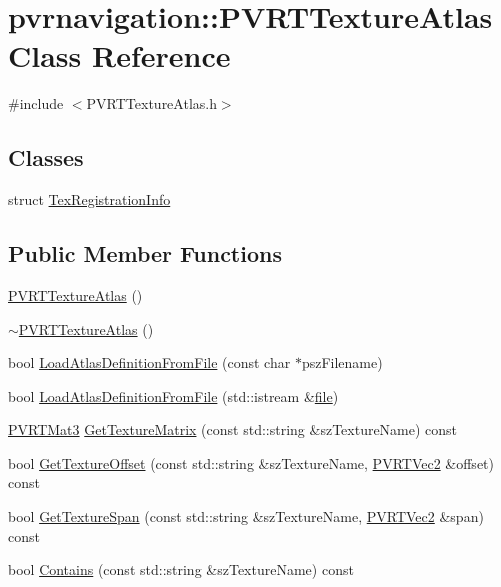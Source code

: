 \hypertarget{classpvrnavigation_1_1_p_v_r_t_texture_atlas}{\section{pvrnavigation\+:\+:P\+V\+R\+T\+Texture\+Atlas Class Reference}
\label{classpvrnavigation_1_1_p_v_r_t_texture_atlas}
}


{\ttfamily \#include $<$P\+V\+R\+T\+Texture\+Atlas.\+h$>$}

\subsection*{Classes}
\begin{DoxyCompactItemize}
\item 
struct \hyperlink{structpvrnavigation_1_1_p_v_r_t_texture_atlas_1_1_tex_registration_info}{Tex\+Registration\+Info}
\end{DoxyCompactItemize}
\subsection*{Public Member Functions}
\begin{DoxyCompactItemize}
\item 
\hyperlink{classpvrnavigation_1_1_p_v_r_t_texture_atlas_aad1bdd02603595fead79b723f3ff6867}{P\+V\+R\+T\+Texture\+Atlas} ()
\item 
\hyperlink{classpvrnavigation_1_1_p_v_r_t_texture_atlas_acd6a9694369ee230dba2a634abbe37fe}{$\sim$\+P\+V\+R\+T\+Texture\+Atlas} ()
\item 
bool \hyperlink{classpvrnavigation_1_1_p_v_r_t_texture_atlas_a825f386181e7795c4715d034c55c4b47}{Load\+Atlas\+Definition\+From\+File} (const char $\ast$psz\+Filename)
\item 
bool \hyperlink{classpvrnavigation_1_1_p_v_r_t_texture_atlas_ab3fbbcd50e6afd17d7d6c37c9cccb699}{Load\+Atlas\+Definition\+From\+File} (std\+::istream \&\hyperlink{structfile}{file})
\item 
\hyperlink{struct_p_v_r_t_mat3}{P\+V\+R\+T\+Mat3} \hyperlink{classpvrnavigation_1_1_p_v_r_t_texture_atlas_ab0095fa962e7bbb41754fee957ab8f0c}{Get\+Texture\+Matrix} (const std\+::string \&sz\+Texture\+Name) const 
\item 
bool \hyperlink{classpvrnavigation_1_1_p_v_r_t_texture_atlas_a0e4f0c3dae96a68cc07f2ecd8c0709de}{Get\+Texture\+Offset} (const std\+::string \&sz\+Texture\+Name, \hyperlink{struct_p_v_r_t_vec2}{P\+V\+R\+T\+Vec2} \&offset) const 
\item 
bool \hyperlink{classpvrnavigation_1_1_p_v_r_t_texture_atlas_af108ef5d3bdf9a28d7979cbc727e3192}{Get\+Texture\+Span} (const std\+::string \&sz\+Texture\+Name, \hyperlink{struct_p_v_r_t_vec2}{P\+V\+R\+T\+Vec2} \&span) const 
\item 
bool \hyperlink{classpvrnavigation_1_1_p_v_r_t_texture_atlas_a0489791f5a7c8489f5303ad6fb1066d2}{Contains} (const std\+::string \&sz\+Texture\+Name) const 
\end{DoxyCompactItemize}
